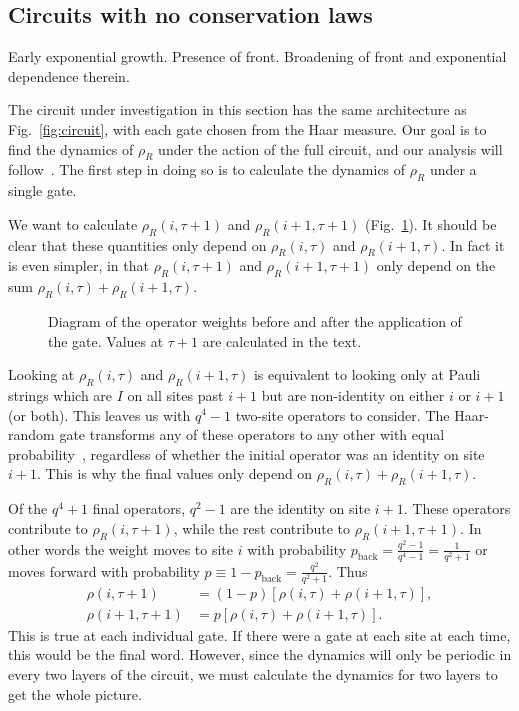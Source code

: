 \documentclass[a4paper,12pt]{article}
\renewcommand{\th}[1]{\frac{1}{#1}}
\renewcommand{\t}{\tau}
\newcommand{\nn}{\nonumber\\}
\begin{document}
\subsection{Circuits with no conservation laws} \label{sub:cncons}

Early exponential growth.
Presence of front.
Broadening of front and exponential dependence therein.

The circuit under investigation in this section has the same architecture as Fig.~\ref{fig:circuit}, with each gate chosen from the Haar measure. Our goal is to find the dynamics of $\rho_R$ under the action of the full circuit, and our analysis will follow~\cite{vonKeyserlingkHydro}. The first step in doing so is to calculate the dynamics of $\rho_R$ under a single gate. 

We want to calculate $\rho_R(i,\tau+1)$ and $\rho_R(i+1, \tau+1)$ (Fig.~\ref{fig:2sites}). It should be clear that these quantities only depend on $\rho_R(i,\tau)$ and $\rho_R(i+1, \tau)$. In fact it is even simpler, in that $\rho_R(i,\tau+1)$ and $\rho_R(i+1, \tau+1)$ only depend on the sum $\rho_R(i,\tau) + \rho_R(i+1, \tau)$. 

\begin{figure}
	\centering
	
	\caption{Diagram of the operator weights before and after the application of the gate. Values at $\t+1$ are calculated in the text.}
	\label{fig:2sites}
\end{figure}

Looking at $\rho_R(i,\tau)$ and $\rho_R(i+1, \tau)$ is equivalent to looking only at Pauli strings which are $I$ on all sites past $i+1$ but are non-identity on either $i$ or $i+1$ (or both).
This leaves us with $q^4-1$ two-site operators to consider. The Haar-random gate transforms any of these operators to any other with equal probability~\cite{BrownScrambling}, regardless of whether the initial operator was an identity on site $i+1$. This is why the final values only depend on $\rho_R(i,\tau) + \rho_R(i+1, \tau)$.

Of the $q^4+1$ final operators, $q^2-1$ are the identity on site $i+1$. These operators contribute to $\rho_R(i,\tau+1)$, while the rest contribute to $\rho_R(i+1, \tau+1)$. In other words the weight moves to site $i$ with probability $p_\text{back} = \frac{q^2-1}{q^4-1} = \th{q^2+1}$ or moves forward with probability $p\equiv 1- p_\text{back} = \frac{q^2}{q^2+1}$. Thus
\begin{align}
\rho(i,\t+1) &= (1-p)\left[\rho(i,\t)+\rho(i+1,\t)\right],\nn
\rho(i+1,\t+1) &= p\left[\rho(i,\t)+\rho(i+1,\t)\right].
\end{align}
This is true at each individual gate. If there were a gate at each site at each time, this would be the final word. However, since the dynamics will only be periodic in every two layers of the circuit, we must calculate the dynamics for two layers to get the whole picture.
\end{document}
